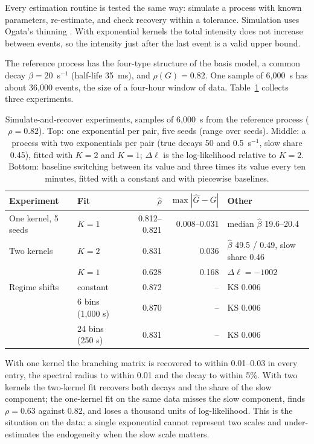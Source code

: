 \documentclass[a4paper,11pt]{article}
\begin{document}
Every estimation routine is tested the same way: simulate a process with known parameters, re-estimate, and check recovery within a tolerance. Simulation uses Ogata's thinning \cite{laub2015}. With exponential kernels the total intensity does not increase between events, so the intensity just after the last event is a valid upper bound.

The reference process has the four-type structure of the basis model, a common decay $\beta = 20$~s$^{-1}$ (half-life 35~ms), and $\rho(G) = 0.82$. One sample of 6,000~s has about 36,000 events, the size of a four-hour window of data. Table~\ref{tab:simulation} collects three experiments.

\begin{table}[htbp]
\centering
\caption{Simulate-and-recover experiments, samples of 6,000~s from the reference process ($\rho = 0.82$). Top: one exponential per pair, five seeds (range over seeds). Middle: a process with two exponentials per pair (true decays 50 and 0.5~s$^{-1}$, slow share 0.45), fitted with $K = 2$ and $K = 1$; $\Delta\ell$ is the log-likelihood relative to $K = 2$. Bottom: baseline switching between its value and three times its value every ten minutes, fitted with a constant and with piecewise baselines.}
\label{tab:simulation}
\small
\begin{tabular}{@{}llrrl@{}}
\toprule
Experiment & Fit & $\hat\rho$ & $\max|\hat G - G|$ & Other \\
\midrule
One kernel, 5 seeds & $K = 1$ & 0.812--0.821 & 0.008--0.031 & median $\hat\beta$ 19.6--20.4 \\
\addlinespace
Two kernels & $K = 2$ & 0.831 & 0.036 & $\hat\beta$ 49.5 / 0.49, slow share 0.46 \\
 & $K = 1$ & 0.628 & 0.168 & $\Delta\ell = -1002$ \\
\addlinespace
Regime shifts & constant & 0.872 & -- & KS 0.006 \\
 & 6 bins (1,000 s) & 0.870 & -- & KS 0.006 \\
 & 24 bins (250 s) & 0.831 & -- & KS 0.006 \\
\bottomrule
\end{tabular}
\end{table}

With one kernel the branching matrix is recovered to within 0.01--0.03 in every entry, the spectral radius to within 0.01 and the decay to within 5\%. With two kernels the two-kernel fit recovers both decays and the share of the slow component; the one-kernel fit on the same data misses the slow component, finds $\rho = 0.63$ against 0.82, and loses a thousand units of log-likelihood. This is the situation on the data: a single exponential cannot represent two scales and under-estimates the endogeneity when the slow scale matters.
\end{document}
